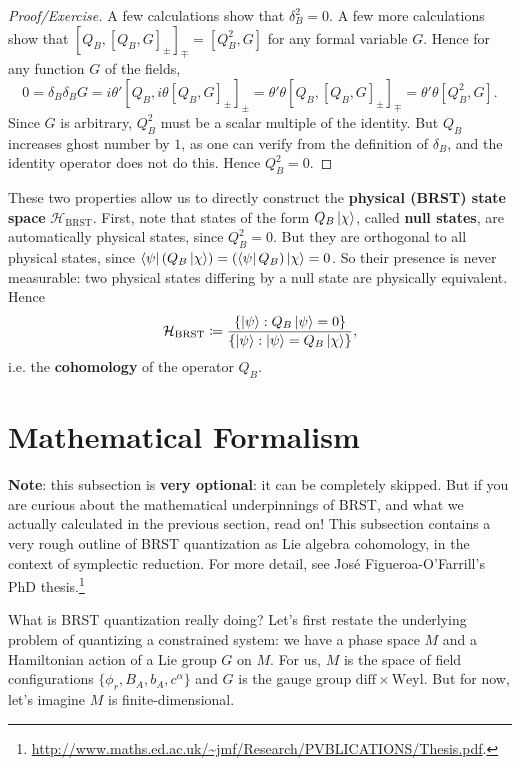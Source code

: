 \documentclass{report}
\theoremstyle{plain}
\theoremstyle{definition}
\theoremstyle{remark}
\newcommand{\cH}{\mathcal{H}}
\newcommand{\diff}{\mathrm{diff}}
\newcommand{\Weyl}{\mathrm{Weyl}}
\begin{document}
\begin{proof}[Proof/Exercise]
  A few calculations show that $\delta_B^2 = 0$. A few more
  calculations show that $[Q_B, [Q_B, G]_{\pm}]_{\mp} = [Q_B^2, G]$
  for any formal variable $G$. Hence for any function $G$ of the
  fields,
  \[ 0 = \delta_B \delta_B G = i\theta' [Q_B, i\theta [Q_B, G]_{\pm}]_{\pm} = \theta' \theta [Q_B, [Q_B, G]_{\pm}]_{\mp} = \theta' \theta [Q_B^2, G]. \]
  Since $G$ is arbitrary, $Q_B^2$ must be a scalar multiple of the
  identity. But $Q_B$ increases ghost number by $1$, as one can verify
  from the definition of $\delta_B$, and the identity operator does
  not do this. Hence $Q_B^2 = 0$.
\end{proof}

These two properties allow us to directly construct the {\bf physical
  (BRST) state space} $\cH_{\text{BRST}}$. First, note that states of
the form $Q_B\ket{\chi}$, called {\bf null states}, are automatically
physical states, since $Q_B^2 = 0$. But they are orthogonal to all
physical states, since $\bra{\psi}(Q_B\ket{\chi}) =
(\bra{\psi}Q_B)\ket{\chi} = 0$. So their presence is never measurable:
two physical states differing by a null state are physically
equivalent. Hence
\[ \cH_{\text{BRST}} \coloneqq \frac{\{\ket{\psi} : Q_B\ket{\psi} = 0\}}{\{\ket{\psi} : \ket{\psi} = Q_B\ket{\chi}\}}, \]
i.e. the {\bf cohomology} of the operator $Q_B$.

\section{Mathematical Formalism}

{\bf Note}: this subsection is {\bf very optional}: it can be
completely skipped. But if you are curious about the mathematical
underpinnings of BRST, and what we actually calculated in the previous
section, read on! This subsection contains a very rough outline of
BRST quantization as Lie algebra cohomology, in the context of
symplectic reduction. For more detail, see Jos\'e Figueroa-O'Farrill's
PhD thesis.\footnote{\url{http://www.maths.ed.ac.uk/~jmf/Research/PVBLICATIONS/Thesis.pdf}.}

What is BRST quantization really doing? Let's first restate the
underlying problem of quantizing a constrained system: we have a phase
space $M$ and a Hamiltonian action of a Lie group $G$ on $M$. For us,
$M$ is the space of field configurations $\{\phi_r, B_A, b_A,
c^\alpha\}$ and $G$ is the gauge group $\diff \times \Weyl$. But for
now, let's imagine $M$ is finite-dimensional.
\end{document}
